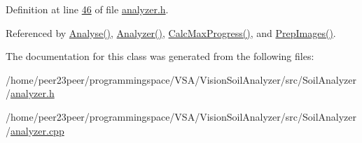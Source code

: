Definition at line \hyperlink{analyzer_8h_source_l00046}{46} of file \hyperlink{analyzer_8h_source}{analyzer.\+h}.



Referenced by \hyperlink{analyzer_8cpp_source_l00054}{Analyse()}, \hyperlink{analyzer_8cpp_source_l00018}{Analyzer()}, \hyperlink{analyzer_8cpp_source_l00112}{Calc\+Max\+Progress()}, and \hyperlink{analyzer_8cpp_source_l00033}{Prep\+Images()}.



The documentation for this class was generated from the following files\+:\begin{DoxyCompactItemize}
\item 
/home/peer23peer/programmingspace/\+V\+S\+A/\+Vision\+Soil\+Analyzer/src/\+Soil\+Analyzer/\hyperlink{analyzer_8h}{analyzer.\+h}\item 
/home/peer23peer/programmingspace/\+V\+S\+A/\+Vision\+Soil\+Analyzer/src/\+Soil\+Analyzer/\hyperlink{analyzer_8cpp}{analyzer.\+cpp}\end{DoxyCompactItemize}
